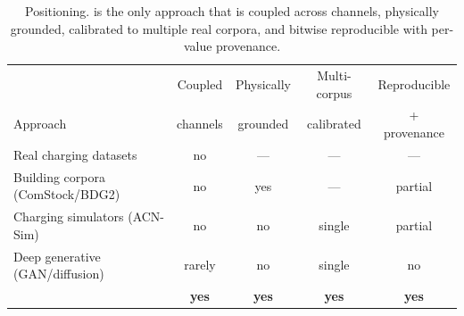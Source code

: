 \begin{table}[t]
\caption{Positioning. \generator{} is the only approach that is coupled
across channels, physically grounded, calibrated to multiple real corpora,
and bitwise reproducible with per-value provenance.}
\label{tab:related}
\centering\small
\begin{tabular}{@{}lcccc@{}}
\toprule
 & Coupled & Physically & Multi-corpus & Reproducible \\
Approach & channels & grounded & calibrated & + provenance \\
\midrule
Real charging datasets & no & --- & --- & --- \\
Building corpora (ComStock/BDG2) & no & yes & --- & partial \\
Charging simulators (ACN-Sim) & no & no & single & partial \\
Deep generative (GAN/diffusion) & rarely & no & single & no \\
\textbf{\generator{}} & \textbf{yes} & \textbf{yes} & \textbf{yes} & \textbf{yes} \\
\bottomrule
\end{tabular}
\end{table}
